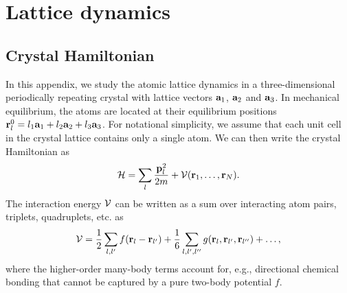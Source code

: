 \appendix

\chapter{Lattice dynamics}

\section{Crystal Hamiltonian}

In this appendix, we study the atomic lattice dynamics in a three-dimensional periodically repeating crystal with lattice vectors $\mathbf{a}_1$, $\mathbf{a}_2$ and $\mathbf{a}_3$. In mechanical equilibrium, the atoms are located at their equilibrium positions $\mathbf{r}^0_l=l_1\mathbf{a}_1+l_2\mathbf{a}_2+l_3\mathbf{a}_3$. For notational simplicity, we assume that each unit cell in the crystal lattice contains only a single atom. We can then write the crystal Hamiltonian as
\begin{equation}
 \mathcal{H} = \sum_{l} \frac{\mathbf{p}_l^2}{2m} + \mathcal{V}(\mathbf{r}_1,\dots,\mathbf{r}_N).
\end{equation}
The interaction energy $\mathcal{V}$ can be written as a sum over interacting atom pairs, triplets, quadruplets, etc. as
\begin{equation}
 \mathcal{V} = \frac{1}{2} \sum_{l,l'} f(\mathbf{r}_{l}-\mathbf{r}_{l'}) + \frac{1}{6} \sum_{l,l',l''} g(\mathbf{r}_l,\mathbf{r}_{l'},\mathbf{r}_{l''}) + \dots,
\end{equation}
where the higher-order many-body terms account for, e.g., directional chemical bonding that cannot be captured by a pure two-body potential $f$. %

